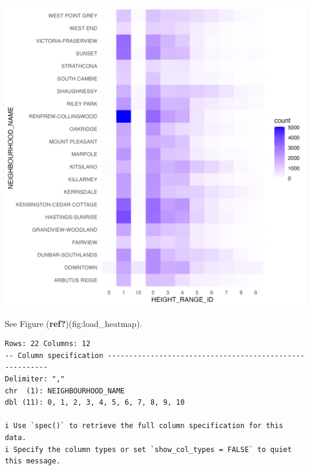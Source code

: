 \documentclass[
  letterpaper,
  DIV=11,
  numbers=noendperiod]{scrartcl}
\begin{document}
\includegraphics[width=7in,height=\textheight]{../results/figures/heatmap.png}

See Figure (\textbf{ref?})(fig:load\_heatmap).

\begin{verbatim}
Rows: 22 Columns: 12
-- Column specification --------------------------------------------------------
Delimiter: ","
chr  (1): NEIGHBOURHOOD_NAME
dbl (11): 0, 1, 2, 3, 4, 5, 6, 7, 8, 9, 10

i Use `spec()` to retrieve the full column specification for this data.
i Specify the column types or set `show_col_types = FALSE` to quiet this message.
\end{verbatim}
\end{document}
